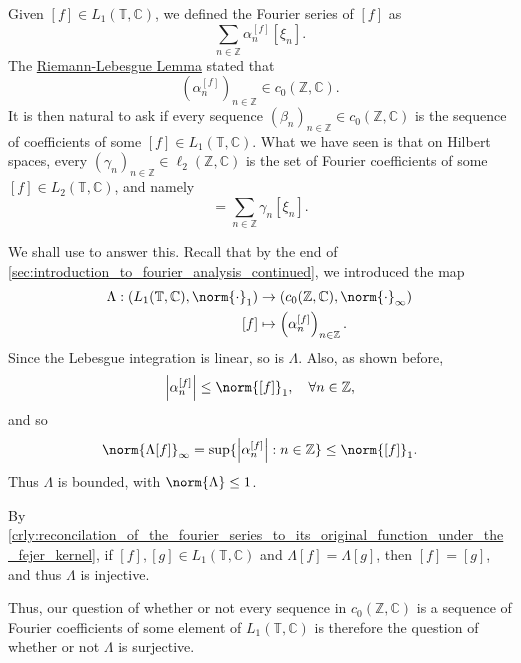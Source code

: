 \documentclass[notoc,notitlepage]{tufte-book}
\begin{document}
Given $[f] \in L_1(\mathbb{T}, \mathbb{C})$, we defined the Fourier series of
$[f]$ as
\begin{equation*}
  \sum_{n \in \mathbb{Z}} \alpha_n^{[f]} [\xi_n].
\end{equation*}
The \hyperref[thm:the_riemann_lebesgue_lemma]{Riemann-Lebesgue Lemma} stated
that
\begin{equation*}
  (\alpha_n^{[f]})_{n \in \mathbb{Z}} \in c_0(\mathbb{Z}, \mathbb{C}).
\end{equation*}
It is then natural to ask if every sequence $(\beta_n)_{n \in \mathbb{Z}}
\in c_0(\mathbb{Z}, \mathbb{C})$ is the sequence of coefficients
of some $[f] \in L_1(\mathbb{T}, \mathbb{C})$.
What we have seen is that on Hilbert spaces,
every $(\gamma_n)_{n \in \mathbb{Z}} \in \ell_2(\mathbb{Z}, \mathbb{C})$
is the set of Fourier coefficients of some $[f] \in L_2(\mathbb{T}, \mathbb{C})$,
and namely
\begin{equation*}
  [f] = \sum_{n \in \mathbb{Z}} \gamma_n[\xi_n].
\end{equation*}

We shall use  to answer this.
Recall that by the end of \cref{sec:introduction_to_fourier_analysis_continued},
we introduced the map
\begin{align*}
    \Lambda : (L_1(\mathbb{T}, \mathbb{C}), \norm{\cdot}_1)
          &\to (c_0(\mathbb{Z}, \mathbb{C}), \norm{\cdot}_\infty) \\
      [f] &\mapsto \left( \alpha_n^{[f]} \right)_{n \in \mathbb{Z}}.
\end{align*}
Since the Lebesgue integration is linear, so is $\Lambda$.
Also, as shown before,
\begin{equation*}
  \abs{\alpha_n^{[f]}} \leq \norm{[f]}_1, \quad \forall n \in \mathbb{Z},
\end{equation*}
and so
\begin{equation*}
  \norm{\Lambda[f]}_{\infty}
  = \sup \{ \abs{\alpha_n^{[f]}} : n \in \mathbb{Z} \} \leq \norm{[f]}_1.
\end{equation*}
Thus $\Lambda$ is bounded, with $\norm{\Lambda} \leq 1$.

By
\cref{crly:reconcilation_of_the_fourier_series_to_its_original_function_under_the_fejer_kernel},
if $[f], [g] \in L_1(\mathbb{T}, \mathbb{C})$ and $\Lambda[f] = \Lambda[g]$,
then $[f] = [g]$, and thus $\Lambda$ is injective.

Thus, our question of whether or not every sequence in $c_0(\mathbb{Z}, \mathbb{C})$
is a sequence of Fourier coefficients of some element of $L_1(\mathbb{T}, \mathbb{C})$
is therefore the question of whether or not $\Lambda$ is surjective.
\end{document}
